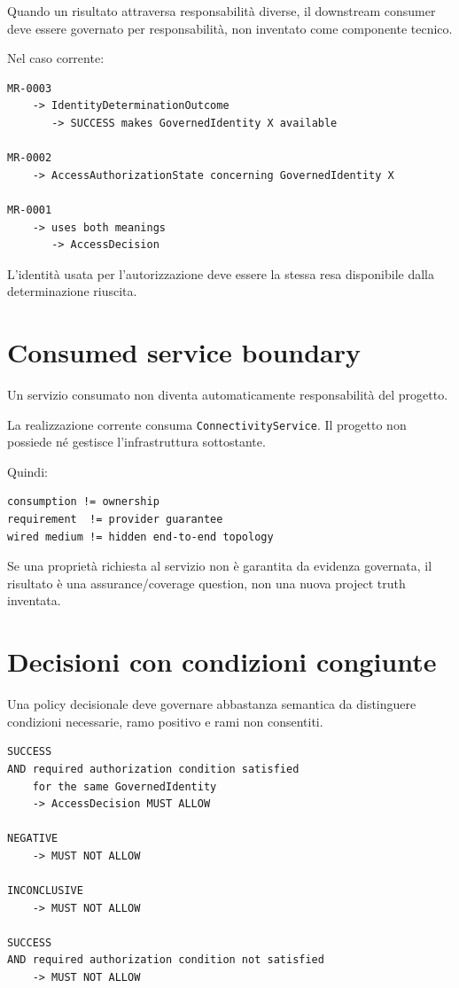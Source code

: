 \documentclass[11pt,a4paper]{article}
\newcommand{\code}[1]{\nolinkurl{#1}}
\begin{document}
Quando un risultato attraversa responsabilità diverse, il downstream consumer deve essere governato per responsabilità, non inventato come componente tecnico.

Nel caso corrente:

\begin{lstlisting}
MR-0003
    -> IdentityDeterminationOutcome
       -> SUCCESS makes GovernedIdentity X available

MR-0002
    -> AccessAuthorizationState concerning GovernedIdentity X

MR-0001
    -> uses both meanings
       -> AccessDecision
\end{lstlisting}

L'identità usata per l'autorizzazione deve essere la stessa resa disponibile dalla determinazione riuscita.

\section{Consumed service boundary}

Un servizio consumato non diventa automaticamente responsabilità del progetto.

\begin{examplebox}[D-3.5]
La realizzazione corrente consuma \code{ConnectivityService}. Il progetto non possiede né gestisce l'infrastruttura sottostante.

Quindi:
\begin{lstlisting}
consumption != ownership
requirement  != provider guarantee
wired medium != hidden end-to-end topology
\end{lstlisting}
\end{examplebox}

Se una proprietà richiesta al servizio non è garantita da evidenza governata, il risultato è una assurance/coverage question, non una nuova project truth inventata.

\section{Decisioni con condizioni congiunte}

Una policy decisionale deve governare abbastanza semantica da distinguere condizioni necessarie, ramo positivo e rami non consentiti.

\begin{examplebox}[D-1.1 / FR-1.1]
\begin{lstlisting}
SUCCESS
AND required authorization condition satisfied
    for the same GovernedIdentity
    -> AccessDecision MUST ALLOW

NEGATIVE
    -> MUST NOT ALLOW

INCONCLUSIVE
    -> MUST NOT ALLOW

SUCCESS
AND required authorization condition not satisfied
    -> MUST NOT ALLOW
\end{lstlisting}
\end{examplebox}
\end{document}
